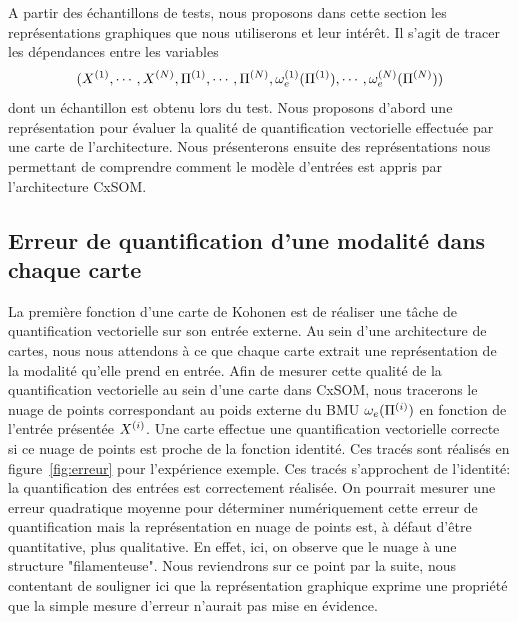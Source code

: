 A partir des échantillons de tests, nous proposons dans cette section les représentations graphiques que nous utiliserons et leur intérêt.
Il s'agit de tracer les dépendances entre les variables $$(X^{({1})}, \cdots, X^{({N})}, \Pi^{({1})}, \cdots, \Pi^{({N})}, \omega_e^{({1})}(\Pi^{({1})}), \cdots, \omega_e^{({N})}(\Pi^{({N})}))$$ dont un échantillon est obtenu lors du test.
Nous proposons d'abord une représentation pour évaluer la qualité de quantification vectorielle effectuée par une carte de l'architecture. Nous présenterons ensuite des représentations nous permettant de comprendre comment le modèle d'entrées est appris par l'architecture CxSOM.
\subsection{Erreur de quantification d'une modalité dans chaque carte}

La première fonction d'une carte de Kohonen est de réaliser une tâche de quantification vectorielle sur son entrée externe. Au sein d'une architecture de cartes, nous nous attendons à ce que chaque carte extrait une représentation de la modalité qu'elle prend en entrée.
Afin de mesurer cette qualité de la quantification vectorielle au sein d'une carte dans CxSOM, nous tracerons le nuage de points correspondant au poids externe du BMU $\omega_e(\Pi^{({i})})$ en fonction de l'entrée présentée $X^{({i})}$. Une carte effectue une quantification vectorielle correcte si ce nuage de points est proche de la fonction identité.
Ces tracés sont réalisés en figure~\ref{fig:erreur} pour l'expérience exemple. Ces tracés s'approchent de l'identité: la quantification des entrées est correctement réalisée.
On pourrait mesurer une erreur quadratique moyenne pour déterminer numériquement cette erreur de quantification mais la représentation en nuage de points est, à défaut d'être quantitative, plus qualitative. En effet, ici, on observe que le nuage à une structure "filamenteuse". Nous reviendrons sur ce point par la suite, nous contentant de souligner ici que la représentation graphique exprime une propriété que la simple mesure d'erreur n'aurait pas mise en évidence. 

